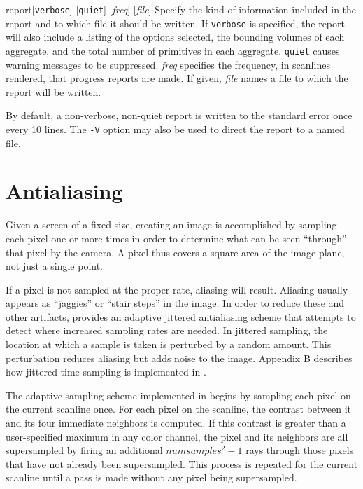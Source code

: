 \begin{defkey}{report}{[{\tt verbose}] [{\tt quiet}] [{\em freq}] [{\em file}]}
	Specify the kind of
	information included in the report and to which
	file it should be written.
	If {\tt verbose} is specified, the
	report will also include a listing of the options selected,
	the 
	bounding volumes of each aggregate,
	and the total number of primitives in each aggregate.
	{\tt quiet} causes warning
	messages to be suppressed.  {\em freq} specifies the frequency,
	in scanlines rendered, that progress reports are made.
	If given, {\em file} names a file to which the report
	will be written.
\end{defkey}
By default, a non-verbose, non-quiet report is 
written to the standard error once every 10 lines.
The {\tt -V} option may also be used to direct the report to a named file.

\section{Antialiasing}

Given a screen of a fixed size, creating an image is accomplished by
sampling each pixel one or more times in order to determine what can
be seen ``through'' that pixel by the camera.  A pixel thus covers
a square area of the image plane, not just a single point.

If a pixel is not sampled at the proper rate, aliasing will result.
Aliasing usually appears as ``jaggies'' or ``stair steps'' in the image.
In order to reduce these and other artifacts, {\rayshade} provides
an adaptive jittered antialiasing scheme that attempts to detect where
increased sampling rates are needed.
In jittered sampling, the location at which a sample is taken is
perturbed by a random amount.  This perturbation reduces aliasing
but adds noise to the image.  Appendix B describes how jittered
time sampling is implemented in {\rayshade}.

The adaptive sampling scheme implemented in {\rayshade} begins
by sampling each pixel on the current scanline once.
For each pixel on the scanline, the contrast between it and its
four immediate neighbors is computed.  If this contrast is greater
than a user-specified maximum in any color channel,
the pixel and its
neighbors are all supersampled by firing an additional
{$numsamples^2 -1$} rays through those pixels that have not already been
supersampled.  This process is repeated for the current scanline
until a pass is made without any
pixel being supersampled.


